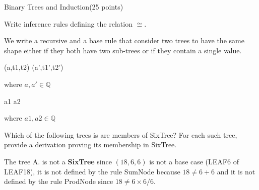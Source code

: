 \documentclass{article}
\begin{document}
%
%
%

\newpage
\begin{question}{Binary Trees and Induction}{(25 points)}
\newcommand{\tree}[3]{(#1,#2,#3)}
\newcommand{\TreeSet}{\Set{Tree}\xspace}
\newcommand{\SixTree}{\Set{SixTree}\xspace}
\newcommand{\ROOT}{\ensuremath{\mathit{root}}}
\newcommand{\rootf}[1]{\ROOT(#1)}

  








  
  \begin{subquestion}
    Write inference rules defining the relation $\cong$.

	We write a recursive and a base rule that consider two trees to have the same shape either if they both have two sub-trees or if they contain a single value. 

	{
	
	\tree{a}{t1}{t2} \cong \tree{a'}{t1'}{t2'} 
	}
	{
	where $a, a' \in \mathbb{Q}$
	}

    \infrule[SameShapeBase]
{
}
{
	
	a1 \cong a2
}
{
	where $a1, a2 \in \mathbb{Q}$
}
    
  \end{subquestion}

  \begin{subquestion}
 Which of the following trees is are members of SixTree? For each such tree, provide a derivation
proving its membership in SixTree.


The tree A. is not a \textbf{SixTree} since $\tree{18}{6}{6}$ is not a base case (LEAF6 of LEAF18), it is not defined by the rule SumNode because $18 \ne 6 + 6$ and it is not defined by the rule ProdNode since $18 \ne 6\times6/6$.
  \end{subquestion}


\end{question}
\end{document}
